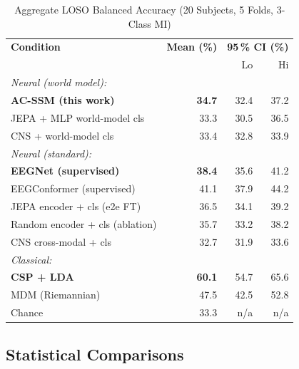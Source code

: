 \documentclass[journal]{IEEEtran}
\begin{document}
\begin{table}[t]
\centering
\caption{Aggregate LOSO Balanced Accuracy (20 Subjects, 5 Folds, 3-Class MI)}
\label{tab:aggregate}
\begin{tabular}{lrrr}
\toprule
\textbf{Condition} & \textbf{Mean (\%)} & \multicolumn{2}{c}{\textbf{95\,\% CI (\%)}} \\
 & & Lo & Hi \\
\midrule
\textit{Neural (world model):} & & & \\
\quad \textbf{AC-SSM (this work)} & \textbf{34.7} & 32.4 & 37.2 \\
\quad JEPA + MLP world-model cls & 33.3 & 30.5 & 36.5 \\
\quad CNS + world-model cls   & 33.4 & 32.8 & 33.9 \\
\midrule
\textit{Neural (standard):} & & & \\
\quad \textbf{EEGNet (supervised)} & \textbf{38.4} & 35.6 & 41.2 \\
\quad EEGConformer (supervised) & 41.1 & 37.9 & 44.2 \\
\quad JEPA encoder + cls (e2e FT)  & 36.5 & 34.1 & 39.2 \\
\quad Random encoder + cls (ablation) & 35.7 & 33.2 & 38.2 \\
\quad CNS cross-modal + cls & 32.7 & 31.9 & 33.6 \\
\midrule
\textit{Classical:} & & & \\
\quad \textbf{CSP + LDA} & \textbf{60.1} & 54.7 & 65.6 \\
\quad MDM (Riemannian) & 47.5 & 42.5 & 52.8 \\
\midrule
Chance & 33.3 & n/a & n/a \\
\bottomrule
\end{tabular}
\end{table}

\subsection{Statistical Comparisons}
\end{document}
